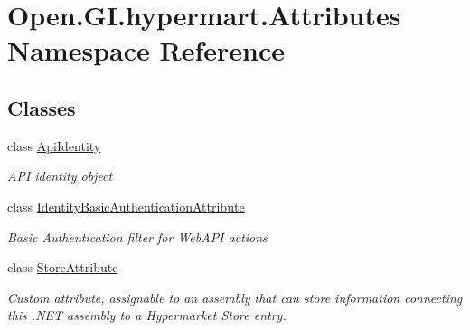 \hypertarget{namespace_open_1_1_g_i_1_1hypermart_1_1_attributes}{}\section{Open.\+G\+I.\+hypermart.\+Attributes Namespace Reference}
\label{namespace_open_1_1_g_i_1_1hypermart_1_1_attributes}
\subsection*{Classes}
\begin{DoxyCompactItemize}
\item 
class \hyperlink{class_open_1_1_g_i_1_1hypermart_1_1_attributes_1_1_api_identity}{Api\+Identity}
\begin{DoxyCompactList}\small\item\em A\+PI identity object \end{DoxyCompactList}\item 
class \hyperlink{class_open_1_1_g_i_1_1hypermart_1_1_attributes_1_1_identity_basic_authentication_attribute}{Identity\+Basic\+Authentication\+Attribute}
\begin{DoxyCompactList}\small\item\em Basic Authentication filter for Web\+A\+PI actions \end{DoxyCompactList}\item 
class \hyperlink{class_open_1_1_g_i_1_1hypermart_1_1_attributes_1_1_store_attribute}{Store\+Attribute}
\begin{DoxyCompactList}\small\item\em Custom attribute, assignable to an assembly that can store information connecting this .N\+ET assembly to a Hypermarket Store entry. \end{DoxyCompactList}\end{DoxyCompactItemize}
